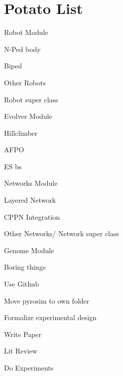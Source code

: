 \documentclass[11pt, letterpaper]{article}
\newcommand{\cmark}{\ding{51}}%
\newcommand{\done}{\rlap{$\square$}{\raisebox{2pt}{\large\hspace{1pt}\cmark}}%
\hspace{-2.5pt}}
\begin{document}
\section*{Potato List}
\begin{todolist}
	\item Robot Module
		\begin{todolist}
			\item[\done] N-Ped body
			\item Biped
			\item Other Robots
			\item Robot super class
		\end{todolist}
	\item Evolver Module
		\begin{todolist}
			\item[\done] Hillclimber
			\item AFPO
			\item ES bs
		\end{todolist}
	\item Networks Module
		\begin{todolist}
			\item[\done] Layered Network
			\item CPPN Integration
			\item Other Networks/ Network super class
		\end{todolist}
	\item Genome Module
	\item Boring things
		\begin{todolist}
			\item[\done] Use Github
			\item Move pyrosim to own folder
			\item Formalize experimental design
			\item Write Paper
			\begin{todolist}
				\item Lit Review
				\item Do Experiments
			\end{todolist}
		\end{todolist}
\end{todolist}
\end{document}
